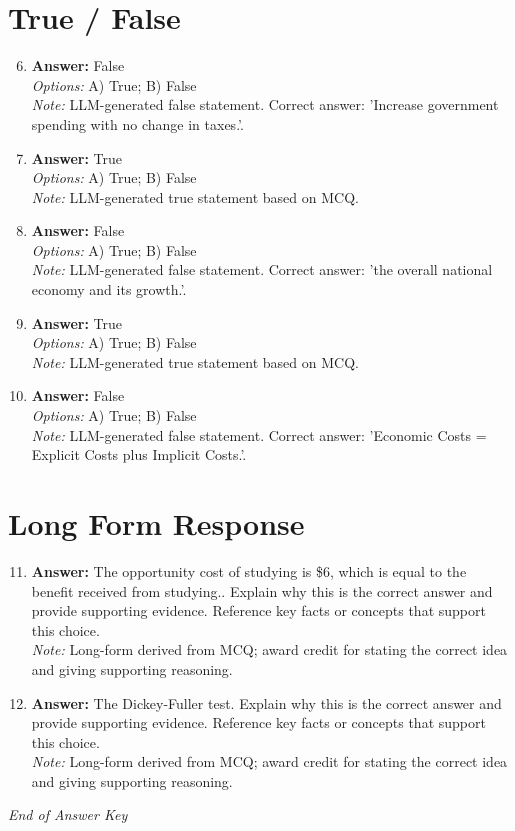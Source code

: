 \documentclass[12pt]{article}
\begin{document}
\section*{True / False}
\begin{enumerate}[label=\arabic*.]
\setcounter{enumi}{5}
\item \textbf{Answer:} False
\\ \textit{Options:} A) True; B) False
\\ \textit{Note:} LLM-generated false statement. Correct answer: 'Increase government spending with no change in taxes.'.
\item \textbf{Answer:} True
\\ \textit{Options:} A) True; B) False
\\ \textit{Note:} LLM-generated true statement based on MCQ.
\item \textbf{Answer:} False
\\ \textit{Options:} A) True; B) False
\\ \textit{Note:} LLM-generated false statement. Correct answer: 'the overall national economy and its growth.'.
\item \textbf{Answer:} True
\\ \textit{Options:} A) True; B) False
\\ \textit{Note:} LLM-generated true statement based on MCQ.
\item \textbf{Answer:} False
\\ \textit{Options:} A) True; B) False
\\ \textit{Note:} LLM-generated false statement. Correct answer: 'Economic Costs = Explicit Costs plus Implicit Costs.'.
\end{enumerate}

\section*{Long Form Response}
\begin{enumerate}[label=\arabic*.]
\setcounter{enumi}{10}
\item \textbf{Answer:} The opportunity cost of studying is \$6, which is equal to the benefit received from studying.. Explain why this is the correct answer and provide supporting evidence. Reference key facts or concepts that support this choice.
\\ \textit{Note:} Long-form derived from MCQ; award credit for stating the correct idea and giving supporting reasoning.
\item \textbf{Answer:} The Dickey-Fuller test. Explain why this is the correct answer and provide supporting evidence. Reference key facts or concepts that support this choice.
\\ \textit{Note:} Long-form derived from MCQ; award credit for stating the correct idea and giving supporting reasoning.
\end{enumerate}

\vfill
\noindent\textit{End of Answer Key}
\end{document}
